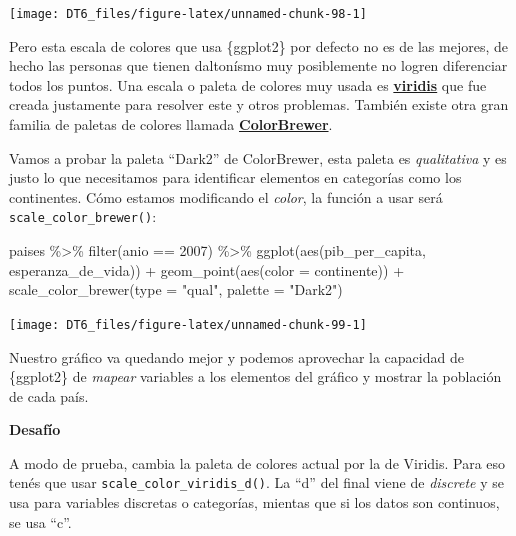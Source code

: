 \documentclass[
  openany]{book}
\newenvironment{Shaded}{\begin{snugshade}}{\end{snugshade}}
\newcommand{\AttributeTok}[1]{\textcolor[rgb]{0.77,0.63,0.00}{#1}}
\newcommand{\DecValTok}[1]{\textcolor[rgb]{0.00,0.00,0.81}{#1}}
\newcommand{\FunctionTok}[1]{\textcolor[rgb]{0.00,0.00,0.00}{#1}}
\newcommand{\NormalTok}[1]{#1}
\newcommand{\SpecialCharTok}[1]{\textcolor[rgb]{0.00,0.00,0.00}{#1}}
\newcommand{\StringTok}[1]{\textcolor[rgb]{0.31,0.60,0.02}{#1}}
\begin{document}
\begin{center}\texttt{[image: DT6\_files/figure-latex/unnamed-chunk-98-1]} \end{center}

Pero esta escala de colores que usa \{ggplot2\} por defecto no es de las mejores, de hecho las personas que tienen daltonísmo muy posiblemente no logren diferenciar todos los puntos.
Una escala o paleta de colores muy usada es \href{https://cran.r-project.org/web/packages/viridis/vignettes/intro-to-viridis.html}{\textbf{viridis}} que fue creada justamente para resolver este y otros problemas.
También existe otra gran familia de paletas de colores llamada \href{https://colorbrewer2.org/}{\textbf{ColorBrewer}}.

Vamos a probar la paleta ``Dark2'' de ColorBrewer, esta paleta es \emph{qualitativa} y es justo lo que necesitamos para identificar elementos en categorías como los continentes.
Cómo estamos modificando el \emph{color}, la función a usar será \texttt{scale\_color\_brewer()}:

\begin{Shaded}
\begin{Highlighting}[]
\NormalTok{paises }\SpecialCharTok{\%\textgreater{}\%} 
  \FunctionTok{filter}\NormalTok{(anio }\SpecialCharTok{==} \DecValTok{2007}\NormalTok{) }\SpecialCharTok{\%\textgreater{}\%} 
  \FunctionTok{ggplot}\NormalTok{(}\FunctionTok{aes}\NormalTok{(pib\_per\_capita, esperanza\_de\_vida)) }\SpecialCharTok{+}
  \FunctionTok{geom\_point}\NormalTok{(}\FunctionTok{aes}\NormalTok{(}\AttributeTok{color =}\NormalTok{ continente)) }\SpecialCharTok{+}
  \FunctionTok{scale\_color\_brewer}\NormalTok{(}\AttributeTok{type =} \StringTok{"qual"}\NormalTok{, }\AttributeTok{palette =} \StringTok{"Dark2"}\NormalTok{)}
\end{Highlighting}
\end{Shaded}

\begin{center}\texttt{[image: DT6\_files/figure-latex/unnamed-chunk-99-1]} \end{center}

Nuestro gráfico va quedando mejor y podemos aprovechar la capacidad de \{ggplot2\} de \emph{mapear} variables a los elementos del gráfico y mostrar la población de cada país.

\textbf{Desafío}

A modo de prueba, cambia la paleta de colores actual por la de Viridis.
Para eso tenés que usar \texttt{scale\_color\_viridis\_d()}.
La ``d'' del final viene de \emph{discrete} y se usa para variables discretas o categorías, mientas que si los datos son continuos, se usa ``c''.
\end{document}
